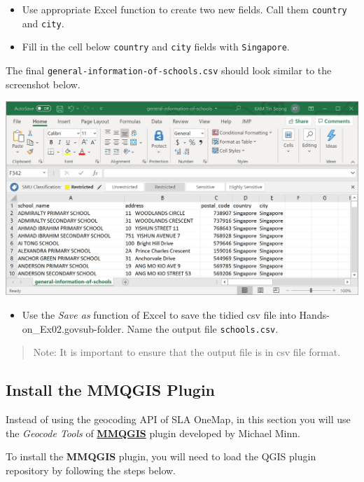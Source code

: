 \documentclass[
  letterpaper,
  DIV=11,
  numbers=noendperiod]{scrreprt}
\providecommand{\tightlist}{%
  \setlength{\itemsep}{0pt}\setlength{\parskip}{0pt}}\usepackage{longtable,booktabs,array}
\begin{document}
\begin{itemize}
\tightlist
\item
  Use appropriate Excel function to create two new fields. Call them
  \texttt{country} and \texttt{city}.
\item
  Fill in the cell below \texttt{country} and \texttt{city} fields with
  \texttt{Singapore}.
\end{itemize}

The final \texttt{general-information-of-schools.csv} should look
similar to the screenshot below.

\includegraphics{./img02/image17.jpg}

\begin{itemize}
\tightlist
\item
  Use the \emph{Save as} function of Excel to save the tidied csv file
  into Hands-on\_Ex02\data\data.gov\aspatial sub-folder. Name the output
  file \texttt{schools.csv}.
\end{itemize}

\begin{quote}
Note: It is important to ensure that the output file is in csv file
format.
\end{quote}

\hypertarget{install-the-mmqgis-plugin}{%
\subsection{Install the MMQGIS Plugin}\label{install-the-mmqgis-plugin}}

Instead of using the geocoding API of SLA OneMap, in this section you
will use the \emph{Geocode Tools} of
\href{http://michaelminn.com/linux/mmqgis/}{\textbf{MMQGIS}} plugin
developed by Michael Minn.

To install the \textbf{MMQGIS} plugin, you will need to load the QGIS
plugin repository by following the steps below.
\end{document}
